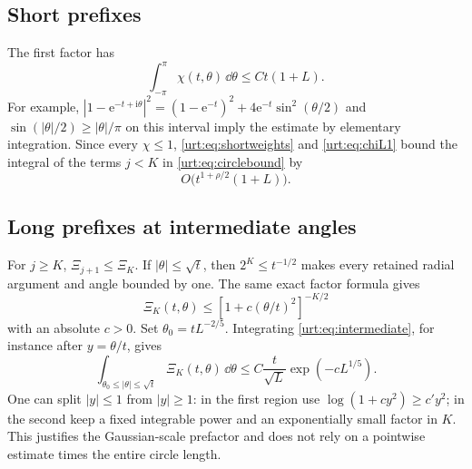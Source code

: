 \documentclass[11pt,letterpaper]{article}
\theoremstyle{remark}\newtheorem{remark}[theorem]{Remark}
\newcommand{\ii}{\mathrm i}\newcommand{\ee}{\mathrm e}\newcommand{\ZZ}{\mathbb Z}\newcommand{\NN}{\mathbb N}
\begin{document}
\subsection{Short prefixes}
The first factor has
\begin{equation}\label{urt:eq:chiL1}
 \int_{-\pi}^{\pi}\chi(t,\theta)\,\dd\theta\le Ct(1+L).
\end{equation}
For example, $|1-\ee^{-t+\ii\theta}|^2=(1-\ee^{-t})^2+4\ee^{-t}\sin^2(\theta/2)$ and $\sin(|\theta|/2)\ge|\theta|/\pi$ on this interval imply the estimate by elementary integration. Since every $\chi\le1$, \eqref{urt:eq:shortweights} and \eqref{urt:eq:chiL1} bound the integral of the terms $j<K$ in \eqref{urt:eq:circlebound} by
\begin{equation}\label{urt:eq:shortint}
 O\bigl(t^{1+\rho/2}(1+L)\bigr).
\end{equation}

\subsection{Long prefixes at intermediate angles}
For $j\ge K$, $\Xi_{j+1}\le\Xi_K$. If $|\theta|\le\sqrt t$, then $2^K\le t^{-1/2}$ makes every retained radial argument and angle bounded by one. The same exact factor formula gives
\begin{equation}\label{urt:eq:intermediate}
 \Xi_K(t,\theta)\le[1+c(\theta/t)^2]^{-K/2}
\end{equation}
with an absolute $c>0$. Set $\theta_0=tL^{-2/5}$. Integrating \eqref{urt:eq:intermediate}, for instance after $y=\theta/t$, gives
\begin{equation}\label{urt:eq:intermediateint}
 \int_{\theta_0\le|\theta|\le\sqrt t}\Xi_K(t,\theta)\,\dd\theta
 \le C\frac{t}{\sqrt L}\exp(-cL^{1/5}).
\end{equation}
One can split $|y|\le1$ from $|y|\ge1$: in the first region use $\log(1+cy^2)\ge c' y^2$; in the second keep a fixed integrable power and an exponentially small factor in $K$. This justifies the Gaussian-scale prefactor and does not rely on a pointwise estimate times the entire circle length.
\end{document}
